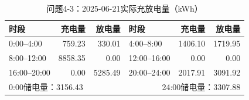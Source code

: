 \begin{table}[H]\centering\small
\caption{问题4-3：2025-06-21实际充放电量（kWh）}
\label{tab:q4_3_0621_storage}
\begin{tabular}{lrrlrr}\toprule
时段 & 充电量 & 放电量 & 时段 & 充电量 & 放电量\\\midrule
0:00--4:00 & 759.23 & 330.01 & 4:00--8:00 & 1406.10 & 1719.95 \\
8:00--12:00 & 8858.35 & 0.00 & 12:00--16:00 & 0.00 & 0.00 \\
16:00--20:00 & 0.00 & 5285.49 & 20:00--24:00 & 2017.91 & 3091.92 \\
\midrule\multicolumn{3}{l}{0:00储电量：3156.43} & \multicolumn{3}{r}{24:00储电量：3307.88}\\
\bottomrule\end{tabular}\end{table}

